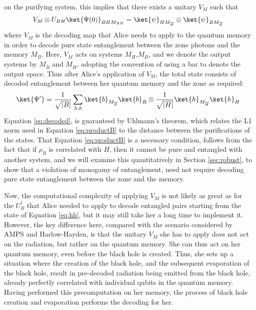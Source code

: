 \documentclass[11pt,a4paper]{article}
\begin{document}
on the purifying system, this implies that there exists a unitary $V_{M}$ such that
\begin{align}
V_{M}\otimes U_{BH}\ket{\Psi(0)}_{BHM_{BH}}=\ket{\psi}_{HM_{\overline{H}}}\otimes\ket{\psi}_{BM_{\overline{B}}}
\end{align}
where $V_{M}$ is the decoding map that Alice needs to apply to the quantum memory in order to decode pure state
entanglement between the zone photons and the memory $M_B$.  Here, $V_{M}$ acts on systems $M_H$,$M_B$, and we denote the output systems
by $M_{\overline{B}}$ and $M_{\overline{H}}$, adopting the convention of using a bar to denote the output space. Thus after Alice's application of $V_{M}$, the total state 
consists of decoded entanglement between her quantum memory and the zone as required: 
\begin{align}
\ket{\Psi'}=\frac{1}{\sqrt{|B|}}
\sum_{h,b}\ket{b}_{M_{\overline B}}\ket{b}_B\otimes \frac{1}{\sqrt{|H|}}\ket{h}_{M_{\overline H}} \ket{h}_{H}
\label{eq:decoded}
\end{align}
Equation \eqref{eq:decoded}, is guaranteed by Uhlmann's theorem\cite{uhlmann1976transition}, which relates the L1 norm used in Equation \eqref{eq:productB} to the distance between the purifications of the states. That Equation \eqref{eq:productB} is a necessary condition, follows from the fact that if $\rho_B$ is correlated with $H$, then it cannot be pure and entangled with another system, and we will examine this quantitatively in Section \ref{sec:robust},
to show that a violation of monogamy of entanglement, need not require decoding pure state entanglement between the zone and the memory.

Now, the computational complexity of applying $V_{M}$ is not likely as great as for the $U^\dagger_R$ that Alice needed to apply to decode entangled pairs starting from
the state of Equation \eqref{eq:hh}, but it may still take her a long time to implement it. However, the key difference here, compared with the scenario considered by AMPS and Harlow-Hayden, is that the unitary $V_{M}$ she has to apply does not act on the radiation, but rather on the quantum memory. She can thus act 
on her quantum memory, even before the black hole is created. Thus, she sets up a situation where the creation of the black hole, and the subsequent evaporation of the black hole, result in pre-decoded radiation being emitted from the black hole, already perfectly correlated with individual qubits in the quantum memory. Having performed this precomputation on her memory, the process of black hole creation and evaporation performs the decoding for her.
\end{document}
